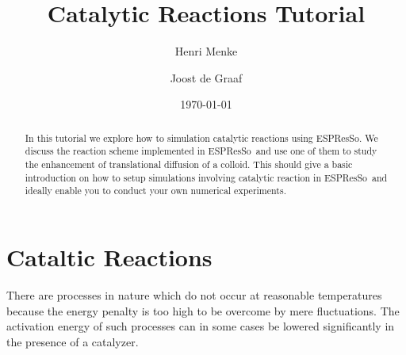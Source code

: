 \documentclass[aip,jcp,reprint,a4paper,onecolumn,nofootinbib,amsmath,amssymb]{revtex4-1}
\newcommand{\es}{\mbox{\textsf{ESPResSo}}\xspace}
\begin{document}
\title{Catalytic Reactions Tutorial}
\author{Henri Menke}
\author{Joost de Graaf}
\date{\today}

\begin{abstract}
  In this tutorial we explore how to simulation catalytic reactions
  using \es.  We discuss the reaction scheme implemented in \es\ and
  use one of them to study the enhancement of translational diffusion
  of a colloid.  This should give a basic introduction on how to setup
  simulations involving catalytic reaction in \es\ and ideally enable
  you to conduct your own numerical experiments.
\end{abstract}

\maketitle

\section{Cataltic Reactions}

There are processes in nature which do not occur at reasonable
temperatures because the energy penalty is too high to be overcome by
mere fluctuations.  The activation energy of such processes can in
some cases be lowered significantly in the presence of a catalyzer.
\end{document}
